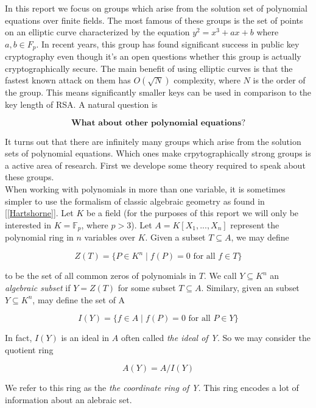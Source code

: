 


In this report we focus on groups which arise from the solution set of polynomial equations over finite fields. The most famous of these groups is the set of points on an elliptic curve characterized by the equation $y^2 = x^3 + ax + b$ where $a,b \in F_p$. In recent years, this group has found significant success in public key cryptography even though it's an open questions whether this group is actually cryptographically secure. The main benefit of using elliptic curves is that the fastest known attack on them has $O(\sqrt{N})$ complexity, where $N$ is the order of the group. This means significantly smaller keys can be used in comparison to the key length of RSA. A natural question is 

$$
\textbf{What about other polynomial equations?}
$$ 

It turns out that there are infinitely many groups which arise from the solution sets of polynomial equations. Which ones make crpytographically strong groups is a active area of research. First we develope some theory required to speak about these groups. \\ 

When working with polynomials in more than one variable, it is sometimes simpler to use the formalism of classic algebraic geometry as found in [\ref{Hartshorne}]. Let $K$ be a field (for the purposes of this report we will only be interested in $K = \mathbb{F}_p$, where $p>3$). Let $A = K[X_1,...,X_n]$ represent the polynomial ring in $n$ variables over $K$. Given a subset $T \subseteq A $, we may define 

$$
Z(T) = \lbrace P \in K^n \mid f(P) = 0 \text{ for all } f \in T \rbrace 
$$ 

to be the set of all common zeros of polynomials in $T$. We call $Y \subseteq K^n $ an \textit{algebraic subset} if $Y = Z(T)$ for some subset $T \subseteq A$. Similary, given an subset $Y \subseteq K^n$, may define the set of A 

$$ 
I(Y) = \lbrace f \in A \mid f(P) = 0 \text { for all } P \in Y \rbrace 
$$ 

In fact, $I(Y)$ is an ideal in $A$ often called \textit{the ideal of Y}. So we may consider the quotient ring 

$$
A(Y) = A / I(Y) 
$$ 

We refer to this ring as the \textit{the coordinate ring of Y}. This ring encodes a lot of information about an alebraic set. 





